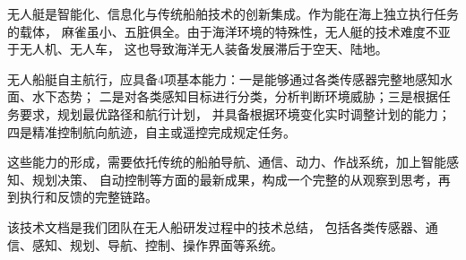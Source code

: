 
\begin{summary}

无人艇是智能化、信息化与传统船舶技术的创新集成。作为能在海上独立执行任务的载体，
麻雀虽小、五脏俱全。由于海洋环境的特殊性，无人艇的技术难度不亚于无人机、无人车，
这也导致海洋无人装备发展滞后于空天、陆地。

无人船艇自主航行，应具备4项基本能力：一是能够通过各类传感器完整地感知水面、水下态势；
二是对各类感知目标进行分类，分析判断环境威胁；三是根据任务要求，规划最优路径和航行计划，
并具备根据环境变化实时调整计划的能力；四是精准控制航向航迹，自主或遥控完成规定任务。

这些能力的形成，需要依托传统的船舶导航、通信、动力、作战系统，加上智能感知、规划决策、
自动控制等方面的最新成果，构成一个完整的从观察到思考，再到执行和反馈的完整链路。

该技术文档是我们团队在无人船研发过程中的技术总结，
包括各类传感器、通信、感知、规划、导航、控制、操作界面等系统。

\end{summary}

